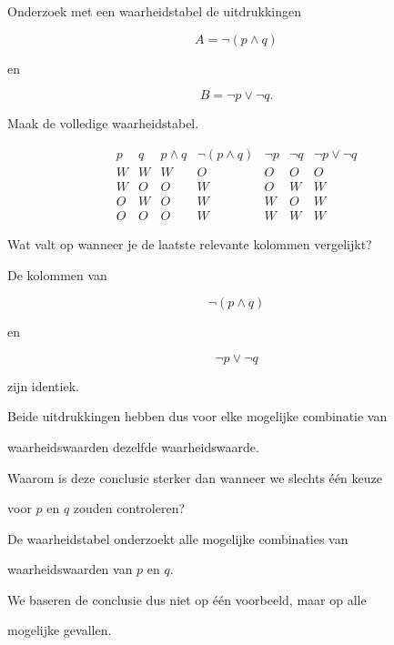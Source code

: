 \documentclass{ximera}
\begin{document}
\begin{oefening}{\oefU \ESS}

Onderzoek met een waarheidstabel de uitdrukkingen

\[
A=\neg(p\land q)
\]

en

\[
B=\neg p\lor\neg q.
\]

\begin{question}

Maak de volledige waarheidstabel.

\begin{oplossing}

\[
\begin{array}{c|c|c|c|c|c|c}
p&q&p\land q&\neg(p\land q)&\neg p&\neg q&
\neg p\lor\neg q\\
\hline
W&W&W&O&O&O&O\\
W&O&O&W&O&W&W\\
O&W&O&W&W&O&W\\
O&O&O&W&W&W&W
\end{array}
\]

\end{oplossing}

\end{question}



\begin{question}

Wat valt op wanneer je de laatste relevante kolommen vergelijkt?

\begin{oplossing}

De kolommen van

\[
\neg(p\land q)
\]

en

\[
\neg p\lor\neg q
\]

zijn identiek.

Beide uitdrukkingen hebben dus voor elke mogelijke combinatie van

waarheidswaarden dezelfde waarheidswaarde.

\end{oplossing}

\end{question}



\begin{question}

Waarom is deze conclusie sterker dan wanneer we slechts één keuze

voor $p$ en $q$ zouden controleren?

\begin{oplossing}

De waarheidstabel onderzoekt alle mogelijke combinaties van

waarheidswaarden van $p$ en $q$.

We baseren de conclusie dus niet op één voorbeeld, maar op alle

mogelijke gevallen.

\end{oplossing}

\end{question}

\end{oefening}
\end{document}
